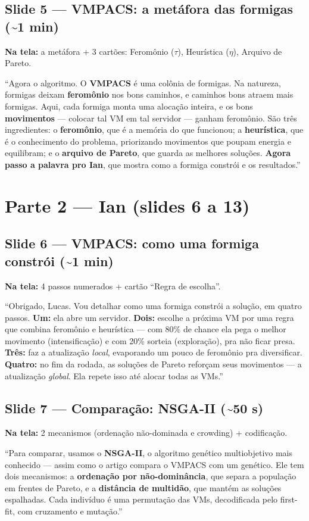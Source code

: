 \documentclass[11pt]{article}
\newcommand{\tela}[1]{\noindent\textcolor{tela}{\textbf{Na tela:} #1}\par\vspace{2pt}}
\newcommand{\tempo}[1]{\hfill\textcolor{cinza}{\small(\textasciitilde #1)}}
\begin{document}
\subsection{Slide 5 --- VMPACS: a metáfora das formigas \tempo{1 min}}
\tela{a metáfora + 3 cartões: Feromônio ($\tau$), Heurística ($\eta$), Arquivo de Pareto.}
\begin{fala}
``Agora o algoritmo. O \textbf{VMPACS} é uma colônia de formigas. Na natureza,
formigas deixam \textbf{feromônio} nos bons caminhos, e caminhos bons atraem mais
formigas. Aqui, cada formiga monta uma alocação inteira, e os bons
\textbf{movimentos} --- colocar tal VM em tal servidor --- ganham feromônio. São
três ingredientes: o \textbf{feromônio}, que é a memória do que funcionou; a
\textbf{heurística}, que é o conhecimento do problema, priorizando movimentos que
poupam energia e equilibram; e o \textbf{arquivo de Pareto}, que guarda as
melhores soluções. \textbf{Agora passo a palavra pro Ian}, que mostra como a
formiga constrói e os resultados.''
\end{fala}

\section{Parte 2 --- Ian (slides 6 a 13)}

\subsection{Slide 6 --- VMPACS: como uma formiga constrói \tempo{1 min}}
\tela{4 passos numerados + cartão ``Regra de escolha''.}
\begin{fala}
``Obrigado, Lucas. Vou detalhar como uma formiga constrói a solução, em quatro
passos. \textbf{Um:} ela abre um servidor. \textbf{Dois:} escolhe a próxima VM
por uma regra que combina feromônio e heurística --- com 80\% de chance ela pega
o melhor movimento (intensificação) e com 20\% sorteia (exploração), pra não
ficar presa. \textbf{Três:} faz a atualização \emph{local}, evaporando um pouco
de feromônio pra diversificar. \textbf{Quatro:} no fim da rodada, as soluções de
Pareto reforçam seus movimentos --- a atualização \emph{global}. Ela repete isso
até alocar todas as VMs.''
\end{fala}

\subsection{Slide 7 --- Comparação: NSGA-II \tempo{50 s}}
\tela{2 mecanismos (ordenação não-dominada e crowding) + codificação.}
\begin{fala}
``Para comparar, usamos o \textbf{NSGA-II}, o algoritmo genético multiobjetivo
mais conhecido --- assim como o artigo compara o VMPACS com um genético. Ele tem
dois mecanismos: a \textbf{ordenação por não-dominância}, que separa a população
em frentes de Pareto, e a \textbf{distância de multidão}, que mantém as soluções
espalhadas. Cada indivíduo é uma permutação das VMs, decodificada pelo first-fit,
com cruzamento e mutação.''
\end{fala}
\end{document}
